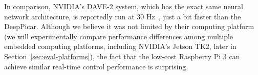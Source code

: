 In comparison, NVIDIA's DAVE-2 system, which has the exact same neural
network architecture, is reportedly run at 30 Hz~\cite{Bojarski2016},
just a bit faster than the DeepPicar. Although we believe it was not
limited by their computing platform (we will experimentally compare
performance differences among multiple embedded computing platforms,
including NVIDIA's Jetson TK2, later in
Section~\ref{sec:eval-platforms}), the fact that the low-cost
Raspberry Pi 3 can achieve similar real-time control performance is
surprising.






